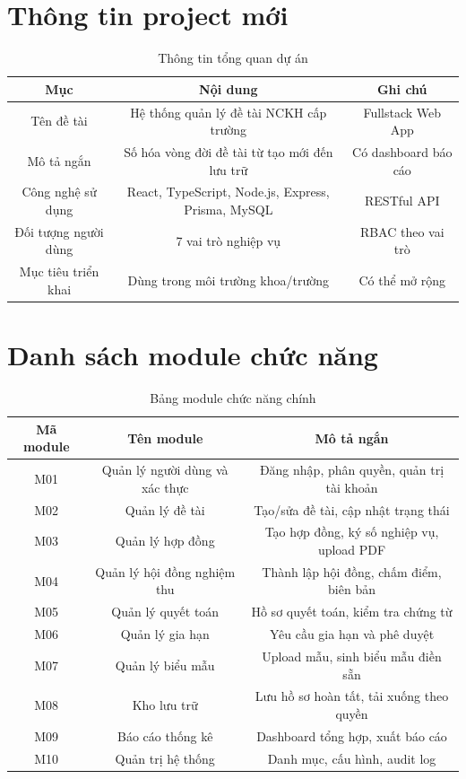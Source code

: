 \documentclass[12pt,a4paper]{report}
\begin{document}
\section{Thông tin project mới}
\begin{table}[H]
\centering
\begin{tabular}{|c|c|c|}
\hline
\textbf{Mục} & \textbf{Nội dung} & \textbf{Ghi chú} \\ \hline
Tên đề tài & Hệ thống quản lý đề tài NCKH cấp trường & Fullstack Web App \\ \hline
Mô tả ngắn & Số hóa vòng đời đề tài từ tạo mới đến lưu trữ & Có dashboard báo cáo \\ \hline
Công nghệ sử dụng & React, TypeScript, Node.js, Express, Prisma, MySQL & RESTful API \\ \hline
Đối tượng người dùng & 7 vai trò nghiệp vụ & RBAC theo vai trò \\ \hline
Mục tiêu triển khai & Dùng trong môi trường khoa/trường & Có thể mở rộng \\ \hline
\end{tabular}
\caption{Thông tin tổng quan dự án}
\end{table}

\section{Danh sách module chức năng}
\begin{table}[H]
\centering
\begin{tabular}{|c|c|c|}
\hline
\textbf{Mã module} & \textbf{Tên module} & \textbf{Mô tả ngắn} \\ \hline
M01 & Quản lý người dùng và xác thực & Đăng nhập, phân quyền, quản trị tài khoản \\ \hline
M02 & Quản lý đề tài & Tạo/sửa đề tài, cập nhật trạng thái \\ \hline
M03 & Quản lý hợp đồng & Tạo hợp đồng, ký số nghiệp vụ, upload PDF \\ \hline
M04 & Quản lý hội đồng nghiệm thu & Thành lập hội đồng, chấm điểm, biên bản \\ \hline
M05 & Quản lý quyết toán & Hồ sơ quyết toán, kiểm tra chứng từ \\ \hline
M06 & Quản lý gia hạn & Yêu cầu gia hạn và phê duyệt \\ \hline
M07 & Quản lý biểu mẫu & Upload mẫu, sinh biểu mẫu điền sẵn \\ \hline
M08 & Kho lưu trữ & Lưu hồ sơ hoàn tất, tải xuống theo quyền \\ \hline
M09 & Báo cáo thống kê & Dashboard tổng hợp, xuất báo cáo \\ \hline
M10 & Quản trị hệ thống & Danh mục, cấu hình, audit log \\ \hline
\end{tabular}
\caption{Bảng module chức năng chính}
\end{table}
\end{document}
